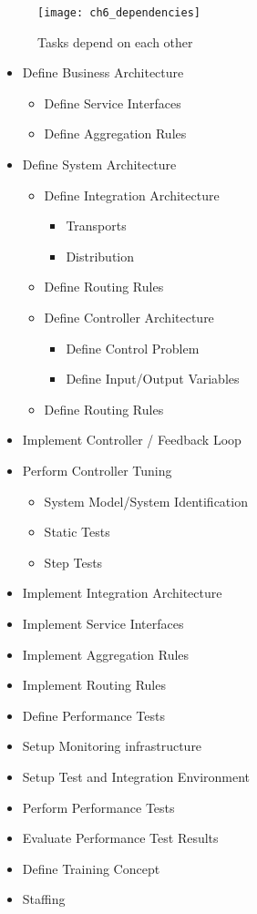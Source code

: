 \begin{figure}[htpb] \centering 
	\texttt{[image: ch6\_dependencies]} 
	\caption{Tasks depend on each other} 
	\label{fig:ch6_dependencies} 
\end{figure}

\begin{itemize}
	\item Define Business Architecture
	\begin{itemize}
		\item Define Service Interfaces
		\item Define Aggregation Rules
	\end{itemize}
	\item Define System Architecture 
	\begin{itemize}
		\item Define Integration Architecture
		\begin{itemize}
			\item Transports
			\item Distribution
		\end{itemize}
		\item Define Routing Rules
		\item Define Controller Architecture 
		\begin{itemize}
			\item Define Control Problem 
			\item Define Input/Output Variables 
		\end{itemize}
		\item Define Routing Rules
	\end{itemize}
	\item Implement Controller / Feedback Loop
	\item Perform Controller Tuning 
	\begin{itemize}
		\item System Model/System Identification 
		\item Static Tests
		\item Step Tests
	\end{itemize}
	\item Implement Integration Architecture
	\item Implement Service Interfaces
	\item Implement Aggregation Rules 
	\item Implement Routing Rules
	\item Define Performance Tests 
	\item Setup Monitoring infrastructure
	\item Setup Test and Integration Environment
	\item Perform Performance Tests
	\item Evaluate Performance Test Results
	\item Define Training Concept
	\item Staffing
\end{itemize}

